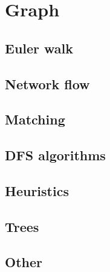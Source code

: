 \chapter{Graph}


\section{Euler walk}

\section{Network flow}

\section{Matching}

\section{DFS algorithms}

\section{Heuristics}

\section{Trees}

\section{Other}

